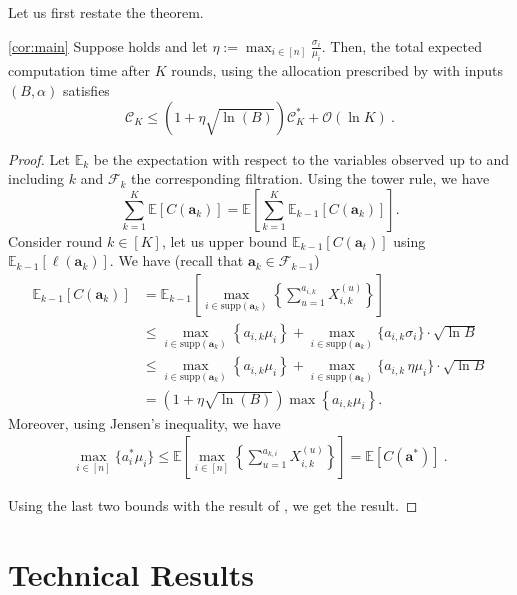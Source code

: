Let us first restate the theorem.
\begin{restate-theorem}{\ref{cor:main}}
	Suppose  holds and let $\eta := \max_{i \in [n]} \frac{\sigma_i}{\mu_i}$.
	Then, the total expected computation time after $K$ rounds, using the allocation prescribed by  with inputs $(B, \alpha)$ satisfies
	$$
	\mathcal{C}_K \le \left(1+\eta\sqrt{\ln(B)}\right)\mathcal{C}_K^* + \mathcal{O}(\ln K)~.
	$$
\end{restate-theorem}
%
\begin{proof}
Let $\mathbb{E}_k$ be the expectation with respect to the variables observed up to and including $k$ and $\mathcal{F}_k$ the corresponding filtration. Using the tower rule, we have
$$
\sum_{k=1}^{K}\mathbb{E}\left[C(\bm{a}_k)\right] = \mathbb{E}\left[ \sum_{k=1}^{K} \mathbb{E}_{k-1}[C(\bm{a}_k)]\right].
$$
Consider round $k \in [K]$, let us upper bound $\mathbb{E}_{k-1}[C(\bm{a}_t)]$ using $\mathbb{E}_{k-1}[\ell(\bm{a}_k)]$. We have (recall that $\bm{a}_k \in \mathcal{F}_{k-1}$)
\begin{align*}
	\mathbb{E}_{k-1}\left[C(\bm{a}_k) \right] &= \mathbb{E}_{k-1}\left[ \max_{i \in \text{supp}(\bm{a}_k)}\left\lbrace \sum_{u=1}^{a_{i,k}} X^{(u)}_{i,k}  \right\rbrace\right]\\
	&\le \max_{i \in \text{supp}(\bm{a}_k)}\left\lbrace a_{i,k} \mu_i\right\rbrace + \max_{i \in \text{supp}(\bm{a}_k)} \{ a_{i,k} \sigma_i\} \cdot \sqrt{\ln B}\\
	&\le \max_{i \in \text{supp}(\bm{a}_k)}\left\lbrace a_{i,k} \mu_i\right\rbrace + \max_{i \in \text{supp}(\bm{a}_k)} \{ a_{i,k}\, \eta\mu_i\} \cdot \sqrt{\ln B}\\
	&= \left(1+\eta \sqrt{\ln(B)}\right)\max\left\lbrace a_{i,k} \mu_i\right\rbrace.
\end{align*}
Moreover, using Jensen's inequality, we have
\begin{align*}
	\max_{i \in [n]} \{a^*_i \mu_i\}
	\le \mathbb{E}\left[\max_{i \in [n]} \left\lbrace \sum_{u=1}^{a_{k,i}} X^{(u)}_{i,k} \right\rbrace \right]
	= \mathbb{E}[C(\bm{a}^*)]~.
\end{align*}

Using the last two bounds with the result of , we get the result.

\end{proof}



\section{Technical Results}
\label{sec:technical}

